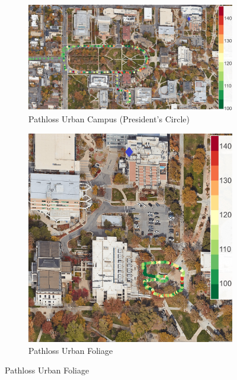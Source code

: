 \documentclass[10pt, twocolumn]{IEEEtran}
\begin{document}
\begin{figure} [t]
     \centering
     \begin{subfigure}{0.48\linewidth}
         \centering
         \includegraphics[width=1.0\linewidth]{figs/pl_urban_campus.jpg}
         \caption{Pathloss Urban Campus (President's Circle)}
         \label{F5a}
     \end{subfigure}
     \begin{subfigure}{0.245\linewidth}
         \centering
         \includegraphics[width=1.0\linewidth]{figs/pl_urban_vegetation.jpg}
         \caption{Pathloss Urban Foliage}
         \label{F5b}
     \end{subfigure}

\end{figure}
\end{document}
